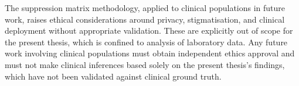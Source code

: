 The suppression matrix methodology, applied to clinical populations in future work, raises ethical considerations around privacy, stigmatisation, and clinical deployment without appropriate validation. These are explicitly out of scope for the present thesis, which is confined to analysis of laboratory data. Any future work involving clinical populations must obtain independent ethics approval and must not make clinical inferences based solely on the present thesis's findings, which have not been validated against clinical ground truth.

